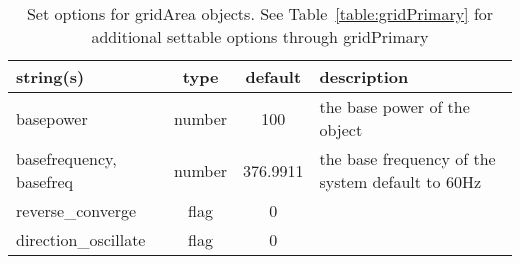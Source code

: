 \begin{table}[ht]
\centering
\begin{tabular}{p{5cm} c c p{7cm}}
\hline
string(s) & type & default & description \\
\hline
basepower & number & 100 & the base power of the object\\
basefrequency, basefreq & number & 376.9911 & the base frequency of the system default to 60Hz\\
reverse\_converge & flag & 0 & \\
direction\_oscillate & flag & 0 & \\
\hline
\end{tabular}
\caption{Set options for gridArea objects. See Table~\ref{table:gridPrimary} for additional settable options through gridPrimary}
\label{table:gridArea}
\end{table}

